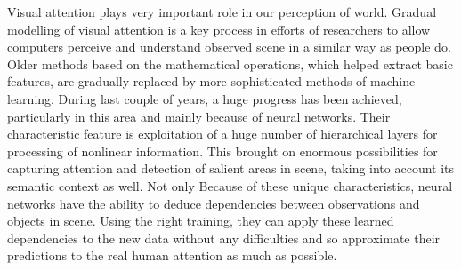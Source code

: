 Visual attention plays very important role in our perception of world. Gradual modelling of visual attention is a key process in efforts of researchers to allow computers perceive and understand observed scene in a similar way as people do. Older methods based on the mathematical operations, which helped extract basic features, are gradually replaced by more sophisticated methods of machine learning. During last couple of years, a huge progress has been achieved, particularly in this area and mainly because of neural networks. Their characteristic feature is exploitation of a huge number of hierarchical layers for processing of nonlinear information. This brought on enormous possibilities for capturing attention and detection of salient areas in scene, taking into account its semantic context as well. Not only Because of these unique characteristics, neural networks have the ability to deduce dependencies between observations and objects in scene. Using the right training, they can apply these learned dependencies to the new data without any difficulties and so approximate their predictions  to the real human attention as much as possible.

\newpage
\null
